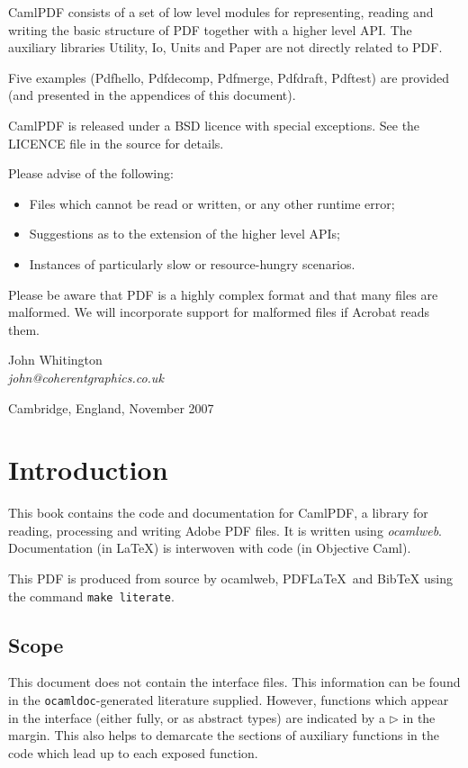 \documentclass[a4paper,10pt]{memoir}
\begin{document}
CamlPDF consists of a set of low level modules for representing, reading and
writing the basic structure of PDF together with a higher level API. The
auxiliary libraries Utility, Io, Units and Paper are not directly related to
PDF.

Five examples (Pdfhello, Pdfdecomp, Pdfmerge, Pdfdraft, Pdftest) are provided
(and presented in the appendices of this document).

CamlPDF is released under a BSD licence with special exceptions. See the
LICENCE file in the source for details.

\noindent Please advise of the following:
\begin{itemize}
  \item Files which cannot be read or written, or any other runtime error;
  \item Suggestions as to the extension of the higher level APIs;
  \item Instances of particularly slow or resource-hungry scenarios.
\end{itemize}

Please be aware that PDF is a highly complex format and that many files are
malformed. We will incorporate support for malformed files if Acrobat reads
them.

\smallgap
\smallgap
\smallgap

\noindent John Whitington\\\textit{john@coherentgraphics.co.uk}

\smallgap

\noindent Cambridge, England, November 2007

\cleardoublepage \tableofcontents

\cleardoublepage

\chapter{Introduction}
This book contains the code and documentation for CamlPDF, a library for
reading, processing and writing Adobe PDF files. It is written using
\emph{ocamlweb}. Documentation (in \LaTeX) is interwoven with code (in
Objective Caml).

This PDF is produced from source by ocamlweb, PDF\LaTeX\ and BibTeX using the
command \texttt{make literate}.

\section{Scope}
This document does not contain the interface files. This information can be
found in the \texttt{ocamldoc}-generated literature supplied. However,
functions which appear in the interface (either fully, or as abstract types)
are indicated by a $\rhd$ in the margin. This also helps to demarcate the
sections of auxiliary functions in the code which lead up to each exposed
function.
\end{document}
